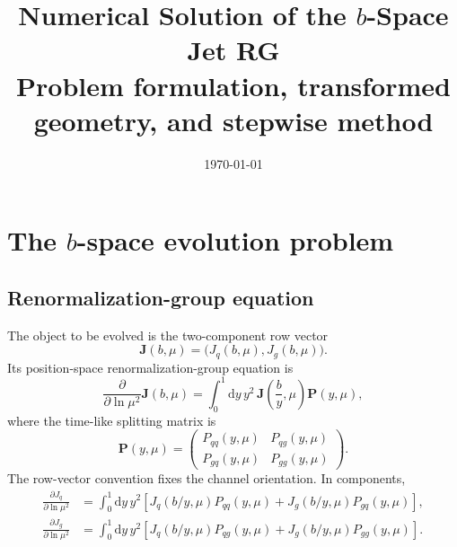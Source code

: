 \documentclass[11pt]{article}
\title{\textbf{Numerical Solution of the \texorpdfstring{\(b\)}{b}-Space Jet RG}\\
\large Problem formulation, transformed geometry, and stepwise method}
\author{}
\date{\today}
\newcommand{\dd}{\mathrm{d}}
\newcommand{\Jvec}{\bm J}
\newcommand{\Pmat}{\bm P}
\begin{document}
\maketitle

\begin{center}
\end{center}

\tableofcontents

\section{The \texorpdfstring{\(b\)}{b}-space evolution problem}

\subsection{Renormalization-group equation}

The object to be evolved is the two-component row vector
\begin{equation}
  \Jvec(b,\mu)
  =
  \bigl(J_q(b,\mu),J_g(b,\mu)\bigr).
  \label{eq:jet-vector}
\end{equation}
Its position-space renormalization-group equation is
\begin{equation}
  \frac{\partial}{\partial\ln\mu^2}\Jvec(b,\mu)
  =
  \int_0^1 \dd y\,y^2\,
  \Jvec\left(\frac{b}{y},\mu\right)\Pmat(y,\mu),
  \label{eq:bspace-rg}
\end{equation}
where the time-like splitting matrix is
\begin{equation}
  \Pmat(y,\mu)
  =
  \begin{pmatrix}
    P_{qq}(y,\mu) & P_{qg}(y,\mu)\\
    P_{gq}(y,\mu) & P_{gg}(y,\mu)
  \end{pmatrix}.
  \label{eq:splitting-matrix}
\end{equation}
The row-vector convention fixes the channel orientation. In components,
\begin{align}
  \frac{\partial J_q}{\partial\ln\mu^2}
  &=
  \int_0^1\dd y\,y^2
  \left[
    J_q(b/y,\mu)P_{qq}(y,\mu)
    +J_g(b/y,\mu)P_{gq}(y,\mu)
  \right],
  \label{eq:bspace-q}
  \\
  \frac{\partial J_g}{\partial\ln\mu^2}
  &=
  \int_0^1\dd y\,y^2
  \left[
    J_q(b/y,\mu)P_{qg}(y,\mu)
    +J_g(b/y,\mu)P_{gg}(y,\mu)
  \right].
  \label{eq:bspace-g}
\end{align}
\end{document}
